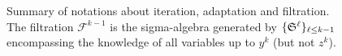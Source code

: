 \begin{figure}[!ht]
{\begin{tikzpicture}
    
    
    
    
  \end{tikzpicture}}
  
  
      \caption{Summary of notations about iteration, adaptation and filtration. The filtration $\mathcal{F}^{k-1}$ is the sigma-algebra generated by $\{\Sel^\ell\}_{\ell\leq k-1}$ encompassing the knowledge of all variables up to $y^k$ (but not $z^k$).}
    \label{fig:proof}
  
  \end{figure}
